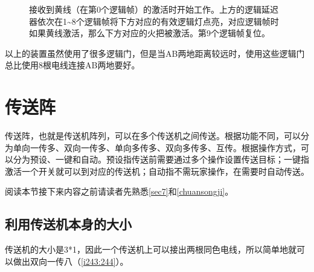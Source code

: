 \begin{figure}[!ht]
\begin{center}
\qquad
{}
\end{center}
\caption{接收到黄线（在第0个逻辑帧）的激活时开始工作。上方的逻辑延迟器依次在1\~{}8个逻辑帧将下方对应的有效逻辑灯点亮，对应逻辑帧时如果黄线激活，那么下方对应的火把被激活。第9个逻辑帧复位。}
\label{i241:242}
\end{figure}

以上的装置虽然使用了很多逻辑门，但是当AB两地距离较远时，使用这些逻辑门总比使用8根电线连接AB两地要好。

\section{传送阵}
传送阵，也就是传送机阵列，可以在多个传送机之间传送。根据功能不同，可以分为单向一传多、双向一传多、单向多传多、双向多传多、互传。根据操作方式，可以分为预设、一键和自动。预设指传送前需要通过多个操作设置传送目标；一键指激活一个开关就可以到对应的传送机；自动指不需玩家操作，在需要时自动传送。

阅读本节接下来内容之前请读者先熟悉\autoref{sec7}和\autoref{chuansongji}。

\subsection{利用传送机本身的大小}
传送机的大小是3*1，因此一个传送机上可以接出两根同色电线，所以简单地就可以做出双向一传八（\autoref{i243:244}）。

